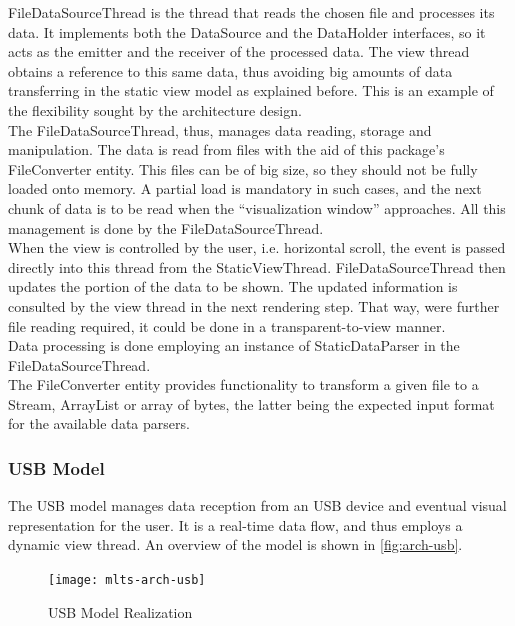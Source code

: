 			FileDataSourceThread is the thread that reads the chosen file and processes its data. It implements both the DataSource and the DataHolder interfaces, so it acts as the emitter and the receiver of the processed data. The view thread obtains a reference to this same data, thus avoiding big amounts of data transferring in the static view model as explained before. This is an example of the flexibility sought by the architecture design.\\

			The FileDataSourceThread, thus, manages data reading, storage and manipulation. The data is read from files with the aid of this package's FileConverter entity. This files can be of big size, so they should not be fully loaded onto memory. A partial load is mandatory in such cases, and the next chunk of data is to be read when the ``visualization window'' approaches. All this management is done by the FileDataSourceThread.\\

			When the view is controlled by the user, i.e. horizontal scroll, the event is passed directly into this thread from the StaticViewThread. FileDataSourceThread then updates the portion of the data to be shown. The updated information is consulted by the view thread in the next rendering step. That way, were further file reading required, it could be done in a transparent-to-view manner.\\

			Data processing is done employing an instance of StaticDataParser in the FileDataSourceThread.\\

			The FileConverter entity provides functionality to transform a given file to a Stream, ArrayList or array of bytes, the latter being the expected input format for the available data parsers.

		\subsubsection{USB Model}
			The USB model manages data reception from an USB device and eventual visual representation for the user. It is a real-time data flow, and thus employs a dynamic view thread. An overview of the model is shown in \autoref{fig:arch-usb}.\\

			\begin{figure}[h]
			\centering
		    	\texttt{[image: mlts-arch-usb]}
	  		\caption{USB Model Realization}
			\label{fig:arch-usb}
			\end{figure}

